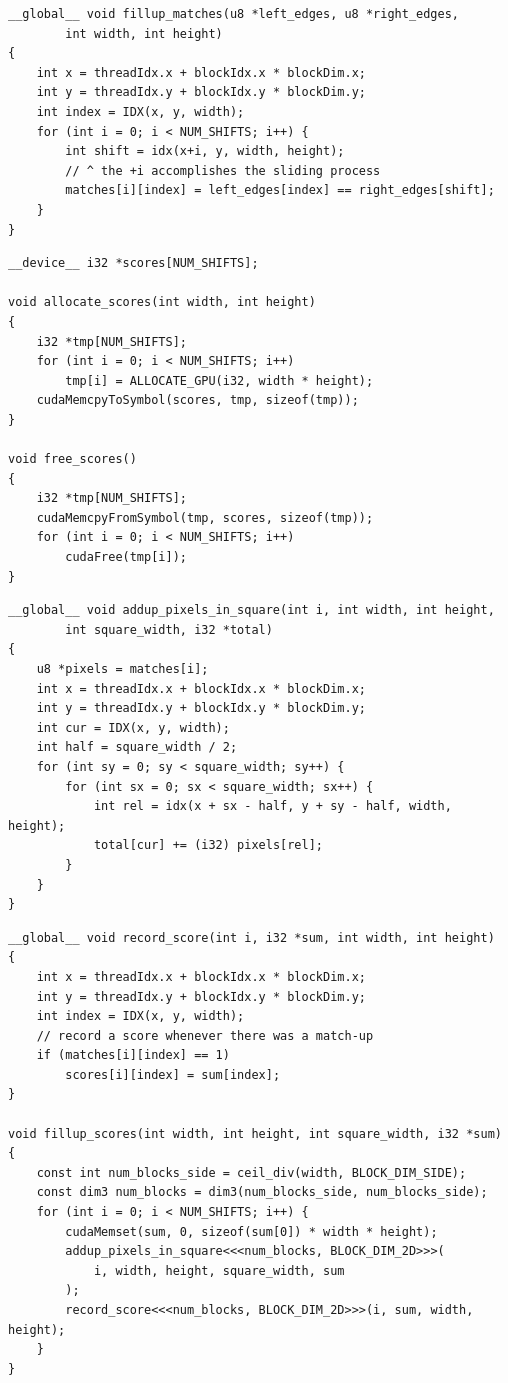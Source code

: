\documentclass[12pt,a4paper,openright,twoside]{report}
\begin{document}
\begin{lstlisting}[style=mystyle]
__global__ void fillup_matches(u8 *left_edges, u8 *right_edges,
        int width, int height)
{
    int x = threadIdx.x + blockIdx.x * blockDim.x;
    int y = threadIdx.y + blockIdx.y * blockDim.y;
    int index = IDX(x, y, width);
    for (int i = 0; i < NUM_SHIFTS; i++) {
        int shift = idx(x+i, y, width, height);
        // ^ the +i accomplishes the sliding process
        matches[i][index] = left_edges[index] == right_edges[shift];
    }
}
\end{lstlisting}

\begin{lstlisting}[style=mystyle]
__device__ i32 *scores[NUM_SHIFTS];

void allocate_scores(int width, int height)
{
    i32 *tmp[NUM_SHIFTS];
    for (int i = 0; i < NUM_SHIFTS; i++)
        tmp[i] = ALLOCATE_GPU(i32, width * height);
    cudaMemcpyToSymbol(scores, tmp, sizeof(tmp));
}

void free_scores()
{
    i32 *tmp[NUM_SHIFTS];
    cudaMemcpyFromSymbol(tmp, scores, sizeof(tmp));
    for (int i = 0; i < NUM_SHIFTS; i++)
        cudaFree(tmp[i]);
}
\end{lstlisting}

\begin{lstlisting}[style=mystyle]
__global__ void addup_pixels_in_square(int i, int width, int height,
        int square_width, i32 *total)
{
    u8 *pixels = matches[i];
    int x = threadIdx.x + blockIdx.x * blockDim.x;
    int y = threadIdx.y + blockIdx.y * blockDim.y;
    int cur = IDX(x, y, width);
    int half = square_width / 2;
    for (int sy = 0; sy < square_width; sy++) {
        for (int sx = 0; sx < square_width; sx++) {
            int rel = idx(x + sx - half, y + sy - half, width, height);
            total[cur] += (i32) pixels[rel];
        }
    }
}
\end{lstlisting}

\begin{lstlisting}[style=mystyle]
__global__ void record_score(int i, i32 *sum, int width, int height)
{
    int x = threadIdx.x + blockIdx.x * blockDim.x;
    int y = threadIdx.y + blockIdx.y * blockDim.y;
    int index = IDX(x, y, width);
    // record a score whenever there was a match-up
    if (matches[i][index] == 1)
        scores[i][index] = sum[index];
}

void fillup_scores(int width, int height, int square_width, i32 *sum)
{
    const int num_blocks_side = ceil_div(width, BLOCK_DIM_SIDE);
    const dim3 num_blocks = dim3(num_blocks_side, num_blocks_side);
    for (int i = 0; i < NUM_SHIFTS; i++) {
        cudaMemset(sum, 0, sizeof(sum[0]) * width * height);
        addup_pixels_in_square<<<num_blocks, BLOCK_DIM_2D>>>(
            i, width, height, square_width, sum
        );
        record_score<<<num_blocks, BLOCK_DIM_2D>>>(i, sum, width, height);
    }
}
\end{lstlisting}
\end{document}
